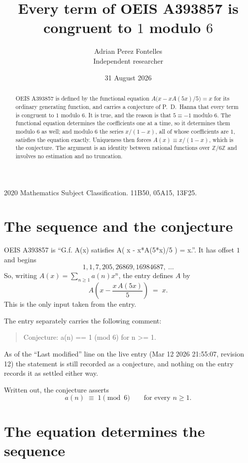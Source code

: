 \documentclass[11pt,a4paper]{article}
\title{Every term of OEIS A393857 is congruent to $1$ modulo $6$}
\author{Adrian Perez Fontelles\\ \small Independent researcher}
\date{31 August 2026}
\theoremstyle{plain}
\theoremstyle{definition}
\begin{document}
\maketitle

\begin{abstract}
OEIS A393857 is defined by the functional equation $A\bigl(x-xA(5x)/5\bigr)=x$ for its
ordinary generating function, and carries a conjecture of P.~D.~Hanna that every term is
congruent to $1$ modulo $6$. It is true, and the reason is that $5\equiv-1$ modulo
$6$. The functional equation determines the coefficients one at a time, so it determines
them modulo $6$ as well; and modulo $6$ the series $x/(1-x)$, all of whose coefficients
are $1$, satisfies the equation exactly. Uniqueness then forces $A(x)\equiv x/(1-x)$, which
is the conjecture. The argument is an identity between rational functions over
$\mathbb{Z}/6\mathbb{Z}$ and involves no estimation and no truncation.
\end{abstract}

\noindent\small 2020 Mathematics Subject Classification. 11B50, 05A15, 13F25.\normalsize

\section{The sequence and the conjecture}

OEIS A393857 is ``G.f. A(x) satisfies A( x - x*A(5*x)/5 ) = x.''. It has offset $1$ and begins
\[
1, 1, 7, 205, 26869, 16984687,\ \dots
\]
So, writing $A(x)=\sum_{n\ge1}a(n)x^{n}$, the entry defines $A$ by
\begin{equation}\label{eq:fe}
A\!\left(x-\frac{x\,A(5x)}{5}\right)\;=\;x .
\end{equation}
This is the only input taken from the entry.

The entry separately carries the following comment:
\begin{quote}\small
Conjecture: a(n) == 1 (mod 6) for n >= 1.
\end{quote}
As of the ``Last modified'' line on the live entry (Mar 12 2026 21:55:07, revision 12) the statement is
still recorded as a conjecture, and nothing on the entry records it as settled either way.

Written out, the conjecture asserts
\begin{equation}\label{eq:conj}
a(n)\;\equiv\;1 \pmod{6}\qquad\text{for every } n\ge1 .
\end{equation}

\section{The equation determines the sequence}
\end{document}
